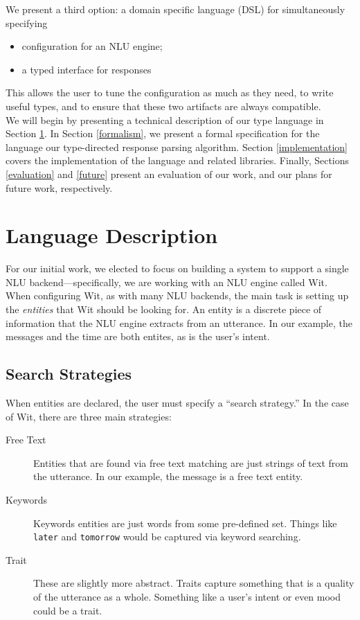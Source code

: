 \documentclass[twocolumn]{article}
\newcommand{\ts}[1]{\texttt{#1}}
\begin{document}
We present a third option: a domain specific language (DSL) for simultaneously
specifying
\begin{itemize}
\item configuration for an NLU engine;
\item a typed interface for responses
\end{itemize}
This allows the user to tune the configuration as much as they need, to write
useful types, and to ensure that these two artifacts are always compatible.
\\

We will begin by presenting a technical description of our type language in
Section \ref{description}. In Section \ref{formalism}, we present a formal
specification for the language our type-directed response parsing algorithm.
Section \ref{implementation} covers the implementation of the language and
related libraries. Finally, Sections \ref{evaluation} and \ref{future} present
an evaluation of our work, and our plans for future work, respectively.

\section{Language Description} \label{description}
For our initial work, we elected to focus on building a system to support a
single NLU backend---specifically, we are working with an NLU engine called
Wit.\cite{wit} When configuring Wit, as with many NLU backends, the main task is
setting up the \emph{entities} that Wit should be looking for. An entity is a
discrete piece of information that the NLU engine extracts from an utterance. In
our example, the messages and the time are both entites, as is the user's
intent.

\subsection{Search Strategies}
When entities are declared, the user must specify a ``search strategy.'' In the
case of Wit, there are three main strategies:
\begin{description}
\item[Free Text] Entities that are found via free text matching are just strings
of text from the utterance. In our example, the message is a free text entity.
\item[Keywords] Keywords entities are just words from some pre-defined set.
  Things like \ts{later} and
  \ts{tomorrow} would be captured via keyword searching.
\item[Trait] These are slightly more abstract. Traits capture something that is
  a quality of the utterance as a whole. Something like a user's intent or even
  mood could be a trait.
\end{description}
\end{document}
